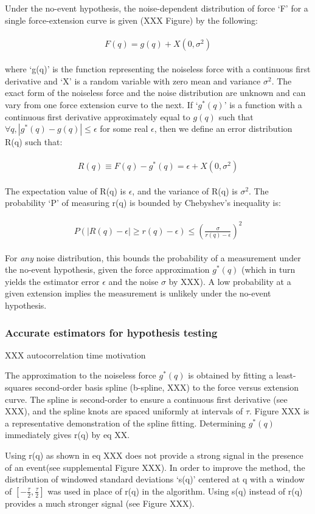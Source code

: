 \documentclass[%
  aip,12pt,tightenlines,
  amsthm,
 amsmath,amssymb
]{article}
\newcommand{\eqs}[1]{
\begin{align*} 
\begin{split}
#1
\end{split}					
\end{align*}}
\newcommand{\firstp}[0]{}
\newcommand{\pl}[0]{\vspace{6pt}}
\begin{document}
\firstp Under the no-event hypothesis, the noise-dependent distribution of force `F' for a single force-extension curve is given (XXX Figure) by the following:

\eqs{ F(q) = g(q) + X(0,\sigma^2) }

where `g(q)' is the function representing the noiseless force with a continuous first derivative and `X' is a random variable with zero mean and variance $\sigma^2$. The exact form of the noiseless force and the noise distribution are unknown and can vary from one force extension curve to the next. If `$g^{*}(q)$' is a function with a continuous first derivative approximately equal to $g(q)$ such that $\forall q, |g^{*}(q)-g(q)| \le \epsilon$ for some real $\epsilon$, then we define an error distribution R(q) such that: \pl

\eqs{ R(q) \equiv F(q) - g^{*}(q) = 
  \epsilon + X(0,\sigma^2)  }

The expectation value of R(q) is $\epsilon$, and the variance of R(q) is $\sigma^2$. The probability `P' of measuring r(q) is bounded by Chebyshev's inequality is:

\eqs{ P( |R(q)-\epsilon| \ge r(q)-\epsilon ) \le
 (\frac{\sigma}{r(q)-\epsilon})^2 }

For \emph{any} noise distribution, this bounds the probability of a measurement under the no-event hypothesis, given the force approximation $g^{*}(q)$ (which in turn yields the estimator error $\epsilon$ and the noise $\sigma$ by XXX). A low probability at a given extension implies the measurement is unlikely under the no-event hypothesis.

\subsubsection{Accurate estimators for hypothesis testing}

XXX autocorrelation time motivation \pl 

The approximation to the noiseless force $g^{*}(q)$ is obtained by fitting a least-squares second-order basis spline (b-spline, XXX) to the force versus extension curve. The spline is second-order to ensure a continuous first derivative (see XXX), and the spline knots are spaced uniformly at intervals of $\tau$. Figure XXX is a representative demonstration of the spline fitting. Determining  $g^{*}(q)$ immediately gives r(q) by eq XX.  \pl

Using r(q) as shown in eq XXX does not provide a strong signal in the presence of an event(see supplemental Figure XXX). In order to improve the method, the distribution of windowed standard deviations `s(q)' centered at q with a window of $[-\frac{\tau}{2},\frac{\tau}{2}]$ was used in place of r(q) in the algorithm. Using s(q) instead of r(q) provides a much stronger signal (see Figure XXX).  \pl
\end{document}
